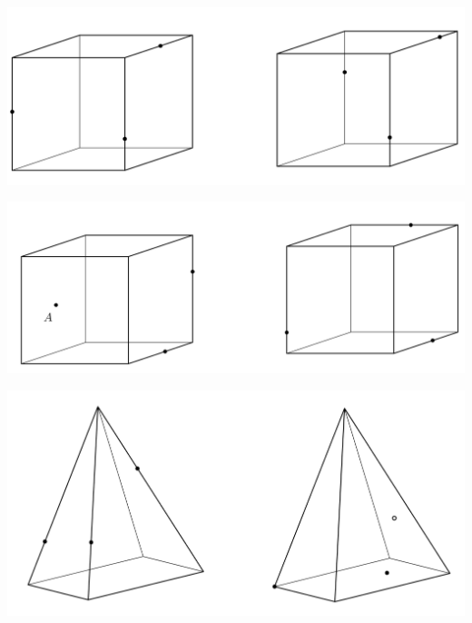 \documentclass{article}
\begin{document}
\includegraphics[width=.99\textwidth]{cube-1.png}

\includegraphics[width=.99\textwidth]{cube-2.png}

\includegraphics[width=.99\textwidth]{pyra.png}
\end{document}
